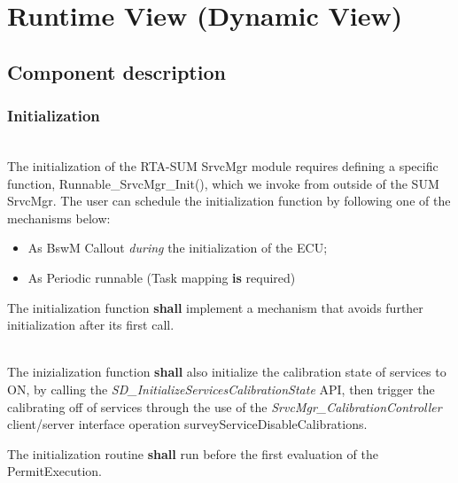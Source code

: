 \chapter{Runtime View (Dynamic View)}

\section{Component description}

\subsection{Initialization}
\label{sec:InitDynamic}

\\
The initialization of the RTA-SUM SrvcMgr module requires defining a specific function, Runnable_SrvcMgr_Init(), which we invoke from outside of the SUM SrvcMgr.
The user can schedule the initialization function by following one of the mechanisms below:

\begin{itemize}
    \item As BswM Callout \textit{during} the initialization of the ECU;
    \item As Periodic runnable (Task mapping \textbf{is} required)
\end{itemize}

The initialization function \textbf{shall} implement a mechanism that avoids further initialization after its first call.
{}

\\
The inizialization function \textbf{shall} also initialize the calibration state of services to ON, by calling the \textit{SD_InitializeServicesCalibrationState} API, then trigger the calibrating off of services through the use of the \textit{SrvcMgr_CalibrationController} client/server interface operation surveyServiceDisableCalibrations.

{}


The initialization routine \textbf{shall} run before the first evaluation of the PermitExecution.

